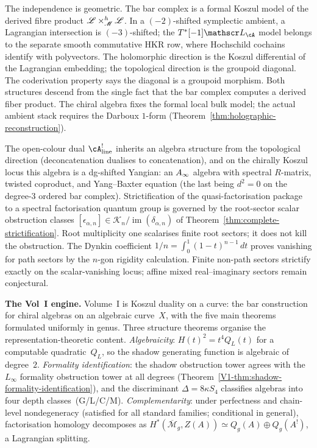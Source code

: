 \medskip

The independence is geometric. The bar complex is a formal Koszul
model of the derived fibre product
$\mathscr{L} \times_{\mathscr{M}}^h \mathscr{L}$.  In a $(-2)$-shifted symplectic
ambient, a Lagrangian intersection is $(-3)$-shifted; the
$T^*[-1]\cL_\cA$ model belongs to the separate smooth commutative HKR
row, where Hochschild cochains identify with polyvectors.  The
holomorphic direction is the Koszul differential of the Lagrangian
embedding; the topological direction is the groupoid diagonal. The
coderivation property says the diagonal is a groupoid morphism. Both
structures descend from the single fact that the bar complex computes
a derived fiber product. The chiral algebra fixes the formal local
bulk model; the actual ambient stack requires the Darboux $1$-form
(Theorem~\ref{thm:holographic-reconstruction}).

The open-colour dual $\cA^!_{\mathrm{line}}$ inherits an algebra structure from the topological direction (deconcatenation dualises to concatenation), and on the chirally Koszul locus this algebra is a dg-shifted Yangian: an $A_\infty$ algebra with spectral $R$-matrix, twisted coproduct, and Yang--Baxter equation (the last being $d^2 = 0$ on the degree-$3$ ordered bar complex). Strictification of the quasi-factorisation package to a spectral factorisation quantum group is governed by the root-sector scalar obstruction classes
$[\epsilon_{\alpha,n}]\in
\mathscr K_n/\operatorname{im}(\delta_{\alpha,n})$ of
Theorem~\ref{thm:complete-strictification}. Root multiplicity one
scalarises finite root sectors; it does not kill the obstruction. The
Dynkin coefficient $1/n=\int_0^1(1-t)^{n-1}\,dt$ proves vanishing for
path sectors by the $n$-gon rigidity calculation. Finite non-path
sectors strictify exactly on the scalar-vanishing locus; affine mixed
real--imaginary sectors remain conjectural.

\medskip
\noindent\textbf{The Vol~I engine.}\enspace
Volume~I is Koszul duality on a curve: the bar construction for chiral algebras on an algebraic curve~$X$, with the five main theorems formulated uniformly in genus. Three structure theorems organise the representation-theoretic content. \emph{Algebraicity}: $H(t)^2 = t^4 Q_L(t)$ for a computable quadratic~$Q_L$, so the shadow generating function is algebraic of degree~$2$. \emph{Formality identification}: the shadow obstruction tower agrees with the $L_\infty$ formality obstruction tower at all degrees (Theorem~\ref{V1-thm:shadow-formality-identification}), and the discriminant $\Delta = 8\kappa S_4$ classifies algebras into four depth classes~(G/L/C/M). \emph{Complementarity}: under perfectness and chain-level nondegeneracy (satisfied for all standard families; conditional in general), factorisation homology decomposes as $H^*(\overline{\mathcal{M}}_g, Z(A)) \simeq Q_g(A) \oplus Q_g(A^!)$, a Lagrangian splitting.


